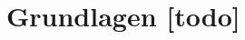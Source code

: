 \begin{comment}
------------------------------------------------------------------------------------------
\end{comment}
\chapter{Grundlagen [todo]}


\begin{comment}
------------------------------------------------------------------------------------------
- Der Überblick und Vergleich der verschiedenen Abstandsbestimmungsverfahren erfolgt über eine klassische Literatursuche, siehe \cite{herranz2010studying, zekavat2011handbook}.

- Wie lange dauert es bis eine Nachricht ausgetauscht worden ist?
	- Beispiel mit einer konkreten Entfernung?
- Wie schnell drifted ein Quarz in einem µc?
	- What is the ppm in the crystal oscillator?
	- https://electronics.stackexchange.com/questions/15851/what-is-the-ppm-in-the-crystal-oscillator
	- In the 1930s, such precise time measurements simply weren't possible; a clock of the required accuracy was difficult enough to build in fixed form, let alone portable. A crystal oscillator, for instance, drifts about 1 to 2 seconds in a month, or 1.4x10−3 seconds an hour.[1] This may sound small, but as light travels 3x108 m/s, this represents a drift of 400 m per hour. Only a few hours of flight time would render such a system unusable, a situation that remained in force until the introduction of commercial atomic clocks in the 1960s.
	- Clock accuracy in ppm
	- http://www.best-microcontroller-projects.com/ppm.html
	
\cite{zekavat2011handbook}
	- Handbook of position location: Theory, practice and advances


\end{comment}
